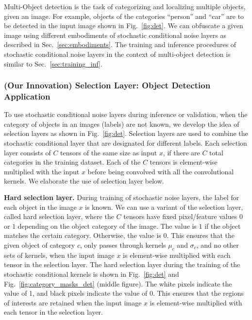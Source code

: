 \documentclass[12pt, letterpaper]{article}
\begin{document}
Multi-Object detection is the task of categorizing and localizing multiple objects, given an image. For example, objects of the categories ``person'' and ``car'' are to be detected in the input image shown in Fig.~\ref{fig:det}. We can obfuscate a given image using different embodiments of stochastic conditional noise layers as described in Sec.~\ref{sec:embodiments}. 
The training and inference procedures of stochastic conditional noise layers in the context of multi-object detection is similar to Sec.~\ref{sec:training_inf}.

\subsubsection{(Our Innovation) Selection Layer: Object Detection Application}
To use stochastic conditional noise layers during inference or validation, when the category of objects in an images (labels) are not known, we develop the idea of selection layers as shown in Fig.~\ref{fig:det}. Selection layers are used to combine the stochastic conditional layer that are designated for different labels. Each selection layer consists of $C$ tensors of the same size as input $x$, if there are $C$ total categories in the training dataset.
Each of the $C$ tensors is element-wise multiplied with the input $x$ before being convolved with all the convolutional kernels. We elaborate the use of selection layer below.

\noindent \textbf{Hard selection layer.}
During training of stochastic noise layers, the label for each object in the image $x$ is known. We can use a variant of the selection layer, called hard selection layer, where the $C$ tensors have fixed pixel/feature values $0$ or $1$ depending on the object category of the image. The value is $1$ if the object matches the certain category. Otherwise, the value is $0$. This ensures that the given object of category $c$, only passes through kernels $\mu_c$ and $\sigma_c$, and no other sets of kernels, when the input image $x$ is element-wise multiplied with each tensor in the selection layer. The hard selection layer during the training of the stochastic conditional kernels is shown in Fig.~\ref{fig:det} and Fig.~\ref{fig:category_masks_det} (middle figure). The white pixels indicate the value of 1, and black pixels indicate the value of 0. This ensures that the regions of interests are retained when the input image $x$ is element-wise multiplied with each tensor in the selection layer.
\end{document}
